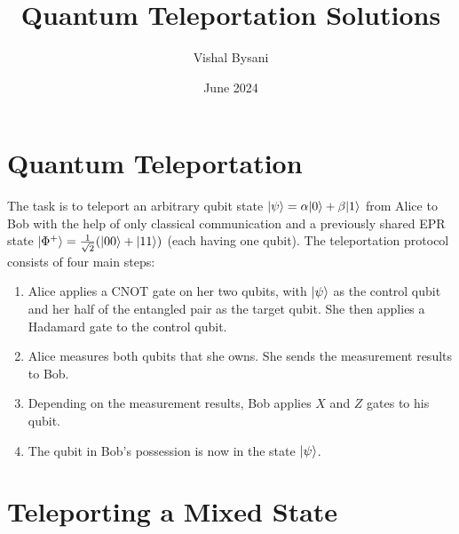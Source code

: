 \documentclass{article}
\title{Quantum Teleportation Solutions}
\author{Vishal Bysani}
\date{June 2024}
\DeclarePairedDelimiter\ket{\lvert}{\rangle}
\begin{document}
\maketitle
\section{Quantum Teleportation}
The task is to teleport an arbitrary qubit state $\ket{\psi} = \alpha\ket{0} + \beta\ket{1}$ from Alice to Bob with the help of only classical communication and a previously shared EPR state $\ket{\Phi^+} = \frac{1}{\sqrt{2}}(\ket{00} + \ket{11})$ (each having one qubit). The teleportation protocol consists of four main steps:
\begin{enumerate}
    \item Alice applies a CNOT gate on her two qubits, with $\ket{\psi}$ as the control qubit and her half of the entangled pair as the target qubit. She then applies a Hadamard gate to the control qubit.
    \item Alice measures both qubits that she owns. She sends the measurement results to Bob.
    \item Depending on the measurement results, Bob applies $X$ and $Z$ gates to his qubit.
    \item The qubit in Bob's possession is now in the state $\ket{\psi}$.
\end{enumerate}

\section{Teleporting a Mixed State}
\end{document}
